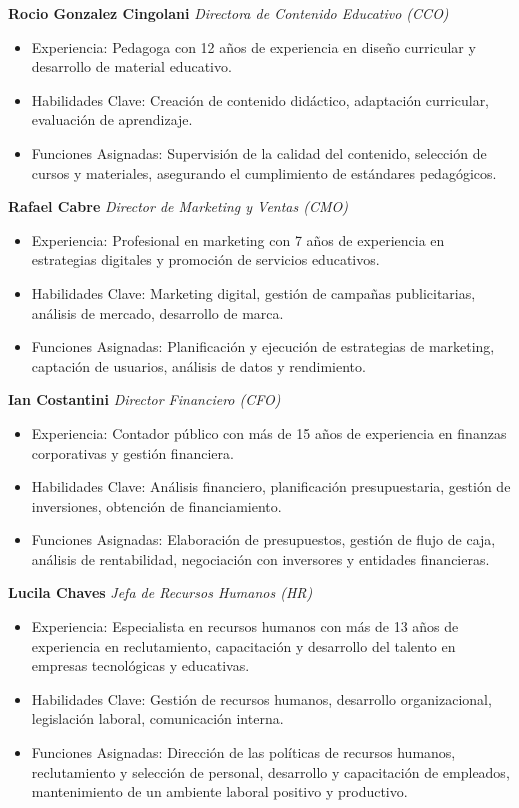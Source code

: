 \documentclass[
]{article}
\providecommand{\tightlist}{%
  \setlength{\itemsep}{0pt}\setlength{\parskip}{0pt}}
\begin{document}
\textbf{Rocio Gonzalez Cingolani} \emph{Directora de Contenido Educativo
(CCO)}

\begin{itemize}
\tightlist
\item
  Experiencia: Pedagoga con 12 años de experiencia en diseño curricular
  y desarrollo de material educativo.
\item
  Habilidades Clave: Creación de contenido didáctico, adaptación
  curricular, evaluación de aprendizaje.
\item
  Funciones Asignadas: Supervisión de la calidad del contenido,
  selección de cursos y materiales, asegurando el cumplimiento de
  estándares pedagógicos.
\end{itemize}

\newpage

\textbf{Rafael Cabre} \emph{Director de Marketing y Ventas (CMO)}

\begin{itemize}
\tightlist
\item
  Experiencia: Profesional en marketing con 7 años de experiencia en
  estrategias digitales y promoción de servicios educativos.
\item
  Habilidades Clave: Marketing digital, gestión de campañas
  publicitarias, análisis de mercado, desarrollo de marca.
\item
  Funciones Asignadas: Planificación y ejecución de estrategias de
  marketing, captación de usuarios, análisis de datos y rendimiento.
\end{itemize}

\textbf{Ian Costantini} \emph{Director Financiero (CFO)}

\begin{itemize}
\tightlist
\item
  Experiencia: Contador público con más de 15 años de experiencia en
  finanzas corporativas y gestión financiera.
\item
  Habilidades Clave: Análisis financiero, planificación presupuestaria,
  gestión de inversiones, obtención de financiamiento.
\item
  Funciones Asignadas: Elaboración de presupuestos, gestión de flujo de
  caja, análisis de rentabilidad, negociación con inversores y entidades
  financieras.
\end{itemize}

\textbf{Lucila Chaves} \emph{Jefa de Recursos Humanos (HR)}

\begin{itemize}
\tightlist
\item
  Experiencia: Especialista en recursos humanos con más de 13 años de
  experiencia en reclutamiento, capacitación y desarrollo del talento en
  empresas tecnológicas y educativas.
\item
  Habilidades Clave: Gestión de recursos humanos, desarrollo
  organizacional, legislación laboral, comunicación interna.
\item
  Funciones Asignadas: Dirección de las políticas de recursos humanos,
  reclutamiento y selección de personal, desarrollo y capacitación de
  empleados, mantenimiento de un ambiente laboral positivo y productivo.
\end{itemize}
\end{document}

